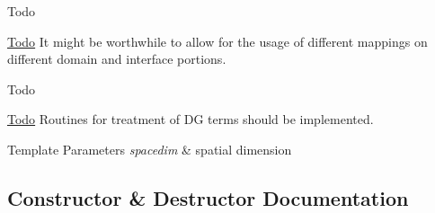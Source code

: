 \begin{DoxyRefDesc}{Todo}
\item[\hyperlink{todo__todo000001}{Todo}]It might be worthwhile to allow for the usage of different mappings on different domain and interface portions.\end{DoxyRefDesc}


\begin{DoxyRefDesc}{Todo}
\item[\hyperlink{todo__todo000002}{Todo}]Routines for treatment of DG terms should be implemented.\end{DoxyRefDesc}



\begin{DoxyTemplParams}{Template Parameters}
{\em spacedim} & spatial dimension \\
\hline
\end{DoxyTemplParams}


\subsection{Constructor \& Destructor Documentation}
